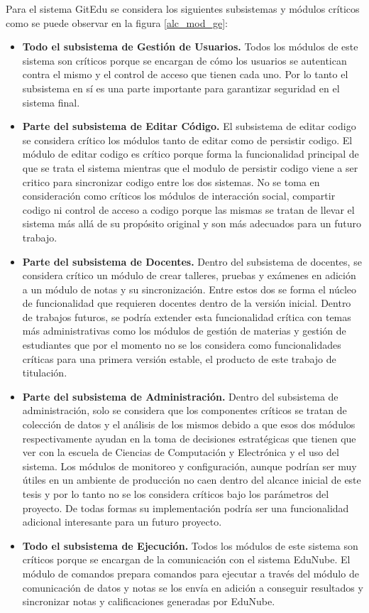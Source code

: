Para el sistema GitEdu se considera los siguientes subsistemas y módulos críticos como se puede observar en la figura \ref{alc_mod_ge}:
\begin{itemize}
	\item \textbf{Todo el subsistema de Gestión de Usuarios.} Todos los módulos de este sistema son críticos porque se encargan de cómo los usuarios se autentican contra el mismo y el control de acceso que tienen cada uno. Por lo tanto el subsistema en sí es una parte importante para garantizar seguridad en el sistema final.
    \item \textbf{Parte del subsistema de Editar Código.} El subsistema de editar codigo se considera crítico los módulos tanto de editar como de persistir codigo. El módulo de editar codigo es crítico porque forma la funcionalidad principal de que se trata el sistema mientras que el modulo de persistir codigo viene a ser critico para sincronizar codigo entre los dos sistemas. No se toma en consideración como críticos los módulos de interacción social, compartir codigo ni control de acceso a codigo porque las mismas se tratan de llevar el sistema más allá de su propósito original y son más adecuados para un futuro trabajo.
    \item \textbf{Parte del subsistema de Docentes.} Dentro del subsistema de docentes, se considera crítico un módulo de crear talleres, pruebas y exámenes en adición a un módulo de notas y su sincronización. Entre estos dos se forma el núcleo de funcionalidad que requieren docentes dentro de la versión inicial. Dentro de trabajos futuros, se podría extender esta funcionalidad crítica con temas más administrativas como los módulos de gestión de materias y gestión de estudiantes que por el momento no se los considera como funcionalidades críticas para una primera versión estable, el producto de este trabajo de titulación.
    \item \textbf{Parte del subsistema de Administración.} Dentro del subsistema de administración, solo se considera que los componentes críticos se tratan de colección de datos y el análisis de los mismos debido a que esos dos módulos respectivamente ayudan en la toma de decisiones estratégicas que tienen que ver con la escuela de Ciencias de Computación y Electrónica y el uso del sistema. Los módulos de monitoreo y configuración, aunque podrían ser muy útiles en un ambiente de producción no caen dentro del alcance inicial de este tesis y por lo tanto no se los considera críticos bajo los parámetros del proyecto. De todas formas su implementación podría ser una funcionalidad adicional interesante para un futuro proyecto.
    \item \textbf{Todo el subsistema de Ejecución.} Todos los módulos de este sistema son críticos porque se encargan de la comunicación con el sistema EduNube. El módulo de comandos prepara comandos para ejecutar a través del módulo de comunicación de datos y notas se los envía en adición a conseguir resultados y sincronizar notas y calificaciones generadas por EduNube.
\end{itemize}

